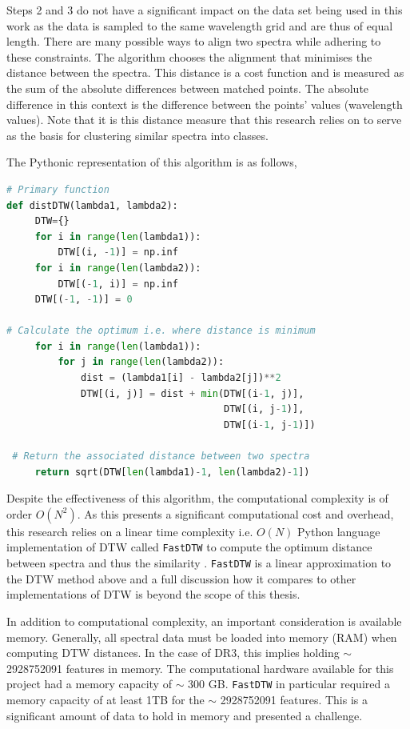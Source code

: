 Steps 2 and 3 do not have a significant impact on the data set being used in this work as the data is sampled to the same wavelength grid and are thus of equal length. There are many possible ways to align two spectra while adhering to these constraints. The algorithm chooses the alignment that minimises the distance between the spectra. This distance is a cost function and is measured as the sum of the absolute differences between matched points. The absolute difference in this context is the difference between the points' values (wavelength values). Note that it is this distance measure that this research relies on to serve as the basis for clustering similar spectra into classes.

The Pythonic representation of this algorithm is as follows,

\begin{lstlisting}[language=Python]
# Primary function
def distDTW(lambda1, lambda2):
     DTW={}
     for i in range(len(lambda1)):
         DTW[(i, -1)] = np.inf
     for i in range(len(lambda2)):
         DTW[(-1, i)] = np.inf
     DTW[(-1, -1)] = 0
 
# Calculate the optimum i.e. where distance is minimum
     for i in range(len(lambda1)):
         for j in range(len(lambda2)):
             dist = (lambda1[i] - lambda2[j])**2
             DTW[(i, j)] = dist + min(DTW[(i-1, j)],
                                      DTW[(i, j-1)], 
                                      DTW[(i-1, j-1)])
 
 # Return the associated distance between two spectra
     return sqrt(DTW[len(lambda1)-1, len(lambda2)-1])
\end{lstlisting}

Despite the effectiveness of this algorithm, the computational complexity is of order $O(N^2)$. As this presents a significant computational cost and overhead, this research relies on a linear time complexity i.e. $O(N)$ Python language implementation of DTW called \texttt{FastDTW} to compute the optimum distance between spectra and thus the similarity \cite{salvador2007toward}. \texttt{FastDTW} is a linear approximation to the DTW method above and a full discussion how it compares to other implementations of DTW is beyond the scope of this thesis. 

In addition to computational complexity, an important consideration is available memory. Generally, all spectral data must be loaded into memory (RAM) when computing DTW distances. In the case of DR3, this implies holding $\sim$ \num[round-precision=2,round-mode=figures, scientific-notation=true]{2928752091} features in memory. The computational hardware available for this project had a memory capacity of $\sim$ 300 GB. \texttt{FastDTW} in particular required a memory capacity of at least 1TB for the $\sim$ \num[round-precision=2,round-mode=figures, scientific-notation=true]{2928752091} features. This is a significant amount of data to hold in memory and presented a challenge.

